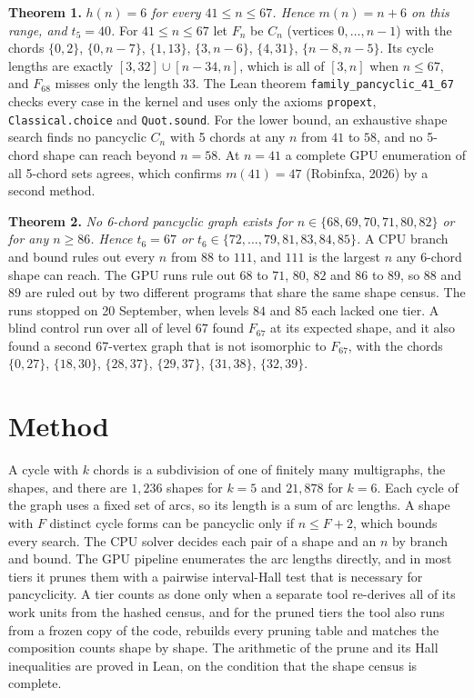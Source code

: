\documentclass[10pt]{article}
\newcommand{\ch}[2]{\{#1,#2\}}
\begin{document}
\textbf{Theorem 1.} \emph{$h(n)=6$ for every $41\le n\le67$. Hence $m(n)=n+6$ on this range, and $t_5=40$.}
For $41\le n\le67$ let $F_n$ be $C_n$ (vertices $0,\dots,n-1$) with the chords $\ch{0}{2}$, $\ch{0}{n{-}7}$, $\ch{1}{13}$, $\ch{3}{n{-}6}$, $\ch{4}{31}$, $\ch{n{-}8}{n{-}5}$. Its cycle lengths are exactly $[3,32]\cup[n-34,n]$, which is all of $[3,n]$ when $n\le67$, and $F_{68}$ misses only the length $33$. The Lean theorem \texttt{family\_pancyclic\_41\_67} checks every case in the kernel and uses only the axioms \texttt{propext}, \texttt{Classical.choice} and \texttt{Quot.sound}. For the lower bound, an exhaustive shape search finds no pancyclic $C_n$ with 5 chords at any $n$ from $41$ to $58$, and no 5-chord shape can reach beyond $n=58$. At $n=41$ a complete GPU enumeration of all 5-chord sets agrees, which confirms $m(41)=47$ (Robinfxa, 2026) by a second method.

\textbf{Theorem 2.} \emph{No 6-chord pancyclic graph exists for $n\in\{68,69,70,71,80,82\}$ or for any $n\ge86$. Hence $t_6=67$ or $t_6\in\{72,\dots,79,81,83,84,85\}$.}
A CPU branch and bound rules out every $n$ from $88$ to $111$, and $111$ is the largest $n$ any 6-chord shape can reach. The GPU runs rule out $68$ to $71$, $80$, $82$ and $86$ to $89$, so $88$ and $89$ are ruled out by two different programs that share the same shape census. The runs stopped on 20 September, when levels $84$ and $85$ each lacked one tier. A blind control run over all of level $67$ found $F_{67}$ at its expected shape, and it also found a second 67-vertex graph that is not isomorphic to $F_{67}$, with the chords $\ch{0}{27}$, $\ch{18}{30}$, $\ch{28}{37}$, $\ch{29}{37}$, $\ch{31}{38}$, $\ch{32}{39}$.

\section{Method}
A cycle with $k$ chords is a subdivision of one of finitely many multigraphs, the shapes, and there are $1{,}236$ shapes for $k=5$ and $21{,}878$ for $k=6$. Each cycle of the graph uses a fixed set of arcs, so its length is a sum of arc lengths. A shape with $F$ distinct cycle forms can be pancyclic only if $n\le F+2$, which bounds every search. The CPU solver decides each pair of a shape and an $n$ by branch and bound. The GPU pipeline enumerates the arc lengths directly, and in most tiers it prunes them with a pairwise interval-Hall test that is necessary for pancyclicity. A tier counts as done only when a separate tool re-derives all of its work units from the hashed census, and for the pruned tiers the tool also runs from a frozen copy of the code, rebuilds every pruning table and matches the composition counts shape by shape. The arithmetic of the prune and its Hall inequalities are proved in Lean, on the condition that the shape census is complete.
\end{document}
